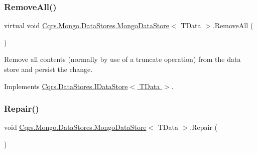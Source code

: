 \mbox{\label{classCqrs_1_1Mongo_1_1DataStores_1_1MongoDataStore_a878966ea796321cae54c3c619e3178d5_a878966ea796321cae54c3c619e3178d5}} 
\subsubsection{\texorpdfstring{Remove\+All()}{RemoveAll()}}
{\footnotesize\ttfamily virtual void \hyperlink{classCqrs_1_1Mongo_1_1DataStores_1_1MongoDataStore}{Cqrs.\+Mongo.\+Data\+Stores.\+Mongo\+Data\+Store}$<$ T\+Data $>$.Remove\+All (\begin{DoxyParamCaption}{ }\end{DoxyParamCaption})\hspace{0.3cm}{\ttfamily [virtual]}}



Remove all contents (normally by use of a truncate operation) from the data store and persist the change. 



Implements \hyperlink{interfaceCqrs_1_1DataStores_1_1IDataStore_aead8d7a39a717d29af05daf7b64bea94_aead8d7a39a717d29af05daf7b64bea94}{Cqrs.\+Data\+Stores.\+I\+Data\+Store$<$ T\+Data $>$}.

\mbox{\label{classCqrs_1_1Mongo_1_1DataStores_1_1MongoDataStore_a1c26771b4a655e138b55b8082795a52f_a1c26771b4a655e138b55b8082795a52f}} 
\subsubsection{\texorpdfstring{Repair()}{Repair()}}
{\footnotesize\ttfamily void \hyperlink{classCqrs_1_1Mongo_1_1DataStores_1_1MongoDataStore}{Cqrs.\+Mongo.\+Data\+Stores.\+Mongo\+Data\+Store}$<$ T\+Data $>$.Repair (\begin{DoxyParamCaption}{ }\end{DoxyParamCaption})}



